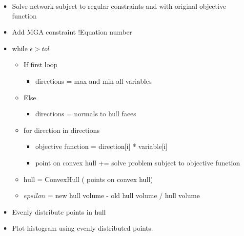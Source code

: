 \begin{itemize}[label={}]
	\item Solve network subject to regular constraints and with original objective function
	\item Add MGA constraint !Equation number
	\item while $\epsilon>tol$
	\begin{itemize}[label={}]
		\item If first loop
		\begin{itemize}[label={}]
			\item directions = max and min all variables
		\end{itemize}
		\item Else
		\begin{itemize}[label={}]
			\item directions = normals to hull faces
		\end{itemize}
		\item for direction in directions
		\begin{itemize}[label={}]
			\item objective function = direction[i] * variable[i]
			\item point on convex hull += solve problem subject to objective function
		\end{itemize}
		\item hull = ConvexHull ( points on convex hull)
		\item $epsilon$ = new hull volume - old hull volume / hull volume
	\end{itemize}
	\item Evenly distribute points in hull 
	\item Plot histogram using evenly distributed points. 
\end{itemize}














